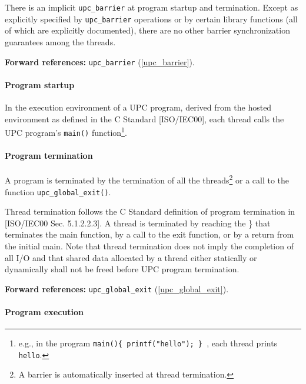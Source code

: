 \np There is an implicit {\tt upc\_barrier} at program startup
     and termination.  Except as explicitly specified by {\tt upc\_barrier} operations
     or by certain library functions (all of which are explicitly documented), there
     are no other barrier synchronization guarantees among the threads.

       {\bf Forward references:} {\tt upc\_barrier} (\ref{upc_barrier}).  

\paragraph{Program startup}

\npf In the execution environment of a UPC program, derived
      from the hosted environment as defined in the C Standard [ISO/IEC00],
      each thread calls the UPC program's {\tt main()}
      function\footnote{e.g., in the program {\tt main()\{
      printf("hello"); \} }, each thread prints {\tt hello}.}.

\paragraph{Program termination}

\npf A program is terminated by the termination of all the
      threads\footnote{A barrier is automatically inserted at thread termination.} or a call
      to the function {\tt upc\_global\_exit()}.

\np Thread termination follows the C Standard definition of
    program termination in [ISO/IEC00 Sec. 5.1.2.2.3]. A thread is
    terminated by reaching the \}  that terminates the main
    function, by a call to the exit function, or by a return from the
    initial main. Note that thread termination does not imply the
    completion of all I/O and that shared data allocated by a thread
    either statically or dynamically shall not be freed before UPC
    program termination.

     {\bf Forward references:} {\tt upc\_global\_exit} (\ref{upc_global_exit}).  

\paragraph{Program execution}
\label{strict_relaxed}

